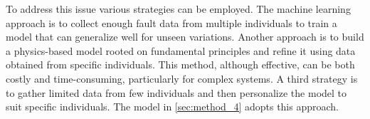 To address this issue various strategies can be employed. The machine learning approach is to collect enough fault data from multiple individuals to train a model that can generalize well for unseen variations. Another approach is to build a physics-based model rooted on fundamental principles and refine it using data obtained from specific individuals. This method, although effective, can be both costly and time-consuming, particularly for complex systems. 
A third strategy is to gather limited data from few individuals and then personalize the model to suit specific individuals. The model in \cref{sec:method_4} adopts this approach. 




